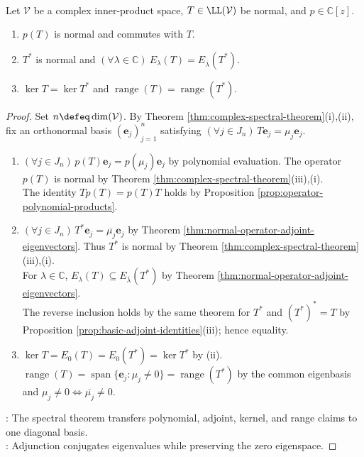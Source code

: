 \begin{proposition} \label{prop:normal-polynomial-kernel-range-properties} \\
Let $\mathcal{V}$ be a complex inner-product space, $T\in\LL(\mathcal{V})$ be normal, and $p\in\mathbb{C}[z]$.
\begin{enumerate}[label=(\roman*)]
\setlength{\itemsep}{0pt}
\item $p(T)$ is normal and commutes with $T$.
\item $T^*$ is normal and $(\forall\lambda\in\mathbb{C})\ E_{\lambda}(T)=E_{\overline{\lambda}}(T^*)$.
\item $\ker T=\ker T^*$ and $\operatorname{range}(T)=\operatorname{range}(T^*)$.
\end{enumerate}
\begin{proof}
Set $n\defeq\dim(\mathcal{V})$. By Theorem \ref{thm:complex-spectral-theorem}(i),(ii), fix an orthonormal basis $(\mathbf{e}_j)_{j=1}^{n}$ satisfying $(\forall j\in J_n)\,T\mathbf{e}_j=\mu_j\mathbf{e}_j$.
\begin{enumerate}[label=(\roman*)]
\setlength{\itemsep}{0pt}
\item $(\forall j\in J_n)\,p(T)\mathbf{e}_j=p(\mu_j)\mathbf{e}_j$ by polynomial evaluation. The operator $p(T)$ is normal by Theorem \ref{thm:complex-spectral-theorem}(iii),(i).\\
The identity $Tp(T)=p(T)T$ holds by Proposition \ref{prop:operator-polynomial-products}.
\item $(\forall j\in J_n)\,T^*\mathbf{e}_j=\overline{\mu_j}\mathbf{e}_j$ by Theorem \ref{thm:normal-operator-adjoint-eigenvectors}. Thus $T^*$ is normal by Theorem \ref{thm:complex-spectral-theorem}(iii),(i).\\
For $\lambda\in\mathbb{C}$, $E_{\lambda}(T)\subseteq E_{\overline{\lambda}}(T^*)$ by Theorem \ref{thm:normal-operator-adjoint-eigenvectors}.\\
The reverse inclusion holds by the same theorem for $T^*$ and $(T^*)^*=T$ by Proposition \ref{prop:basic-adjoint-identities}(iii); hence equality.
\item $\ker T=E_0(T)=E_0(T^*)=\ker T^*$ by (ii).\\
$\operatorname{range}(T)=\operatorname{span}\{\mathbf{e}_j:\mu_j\neq0\}=\operatorname{range}(T^*)$ by the common eigenbasis and $\mu_j\neq0\Longleftrightarrow\overline{\mu_j}\neq0$.
\end{enumerate}
: The spectral theorem transfers polynomial, adjoint, kernel, and range claims to one diagonal basis.\\
: Adjunction conjugates eigenvalues while preserving the zero eigenspace.
\end{proof}
\end{proposition}

